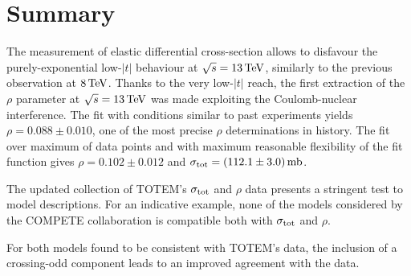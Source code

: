 \section{Summary}
\label{sec:summary}

The measurement of elastic differential cross-section allows to disfavour the purely-exponential low-$|t|$ behaviour at $\sqrt s = 13\,{\rm TeV}$, similarly to the previous observation at $8\,{\rm TeV}$. Thanks to the very low-$|t|$ reach, the first extraction of the $\rho$ parameter at $\sqrt s = 13\,{\rm TeV}$ was made exploiting the Coulomb-nuclear interference. The fit with conditions similar to past experiments yields $\rho = 0.088 \pm 0.010$, one of the most precise $\rho$ determinations in history. The fit over maximum of data points and with maximum reasonable flexibility of the fit function gives $\rho = 0.102 \pm 0.012$ and $\sigma_{\rm tot} = (112.1 \pm 3.0)\,{\rm mb}$.

The updated collection of TOTEM's $\sigma_{\rm tot}$ and $\rho$ data presents a stringent test to model descriptions. For an indicative example, none of the models considered by the COMPETE collaboration is compatible both with $\sigma_{\rm tot}$ and $\rho$.

For both models found to be consistent with TOTEM's data, the inclusion of a crossing-odd component leads to an improved agreement with the data.
